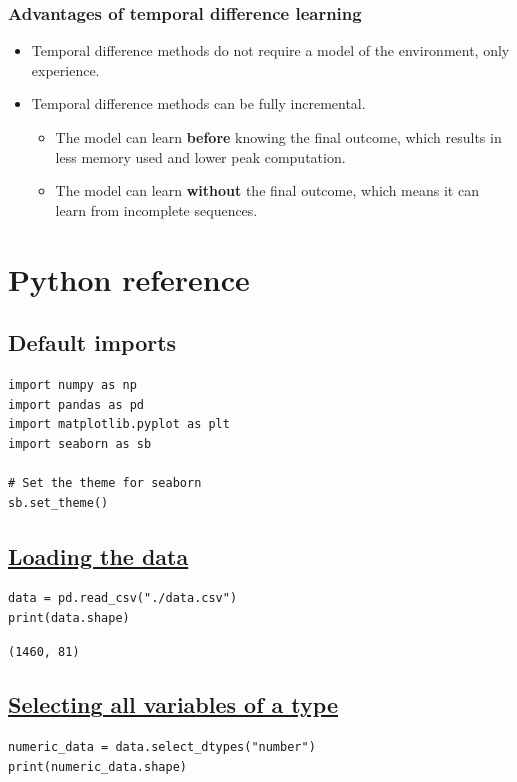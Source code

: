\documentclass[11pt]{article}
\begin{document}
\subsubsection{Advantages of temporal difference learning}
\label{sec:org24bc3dc}
\begin{itemize}
\item Temporal difference methods do not require a model of the environment, only experience.
\item Temporal difference methods can be fully incremental.
\begin{itemize}
\item The model can learn \textbf{before} knowing the final outcome, which results in less memory used and lower peak computation.
\item The model can learn \textbf{without} the final outcome, which means it can learn from incomplete sequences.
\end{itemize}
\end{itemize}

 \newpage
\section{Python reference}
\label{sec:orge8021e6}

\subsection{Default imports}
\label{sec:orga36bb3c}
\begin{verbatim}
import numpy as np
import pandas as pd
import matplotlib.pyplot as plt
import seaborn as sb

# Set the theme for seaborn
sb.set_theme()
\end{verbatim}
\subsection{\href{https://pandas.pydata.org/docs/reference/api/pandas.read\_csv.html}{Loading the data}}
\label{sec:org21e047a}
\begin{verbatim}
data = pd.read_csv("./data.csv")
print(data.shape)
\end{verbatim}

\label{org8cec87b}
\begin{verbatim}
(1460, 81)
\end{verbatim}


 \newpage
\subsection{\href{https://pandas.pydata.org/docs/reference/api/pandas.DataFrame.select\_dtypes.html}{Selecting all variables of a type}}
\label{sec:orge3edcec}
\begin{verbatim}
numeric_data = data.select_dtypes("number")
print(numeric_data.shape)
\end{verbatim}
\end{document}

